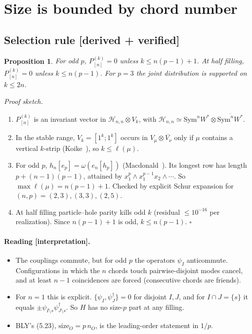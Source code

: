 \documentclass[11pt]{article}
\newcommand{\tagbox}[2]{\textsf{\small\color{#1}[#2]}}
\newcommand{\VER}{\tagbox{cder}{derived + verified}}
\newcommand{\INTERP}{\tagbox{cconj}{interpretation}}
\newtheorem{proposition}{Proposition}
\theoremstyle{remark}
\begin{document}
\section{Size is bounded by chord number}\label{sec:selection}
\subsection{Selection rule \VER}
\begin{proposition}\label{prop:sel}
For odd $p$, $P^{(k)}_{[n]}=0$ unless $k\le n(p-1)+1$. At half filling, $P^{(k)}_{[n]}=0$ unless $k\le n(p-1)$. For
$p=3$ the joint distribution is supported on $k\le2n$.
\end{proposition}
\noindent\emph{Proof sketch.}
\begin{enumerate}\itemsep1pt
\item $P^{(k)}_{[n]}$ is an invariant vector in $\mathcal H_{n,n}\otimes V_k$, with
  $\mathcal H_{n,n}\simeq\mathrm{Sym}^nW^*\otimes\overline{\mathrm{Sym}^nW^*}$.
\item In the stable range, $V_k=[1^k;1^k]$ occurs in $V_\mu\otimes\overline{V_\nu}$ only if $\mu$ contains a vertical
  $k$-strip (Koike~\cite{Koike}), so $k\le\ell(\mu)$.
\item For odd $p$, $h_n[e_p]=\omega(e_n[h_p])$ (Macdonald~\cite{Macdonald}). Its longest row has length $p+(n-1)(p-1)$,
  attained by $x_1^p\wedge x_1^{p-1}x_2\wedge\cdots$. So $\max\ell(\mu)=n(p-1)+1$. Checked by explicit Schur expansion
  for $(n,p)=(2,3),(3,3),(2,5)$.
\item At half filling particle--hole parity kills odd $k$ (residual $\le10^{-16}$ per realization). Since $n(p-1)+1$
  is odd, $k\le n(p-1)$. $\square$
\end{enumerate}

\paragraph{Reading \INTERP.}
\begin{itemize}\itemsep1pt
\item The couplings commute, but for odd $p$ the operators $\psi_I$ anticommute. Configurations in which the $n$ chords
  touch pairwise-disjoint modes cancel, and at least $n-1$ coincidences are forced (consecutive chords are friends).
\item For $n=1$ this is explicit. $\{\psi_I,\psi_J^\dagger\}=0$ for disjoint $I,J$, and for $I\cap J=\{s\}$ it equals
  $\pm\psi_{I\setminus s}\psi^\dagger_{J\setminus s}$. So $H$ has no size-$p$ part at any filling.
\item BLY's (5.23), $\mathrm{size}_O=p\,n_O$, is the leading-order statement in $1/p$.
\end{itemize}
\end{document}
